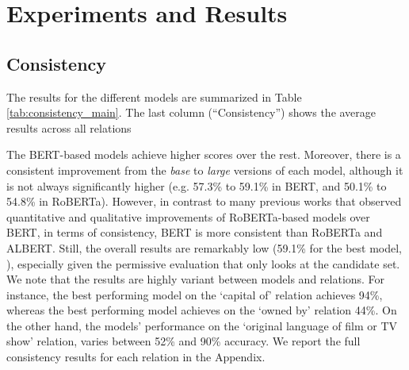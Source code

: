 \section{Experiments and Results}
\label{sec:experiments}




\subsection{Consistency}

The results for the different models are summarized in Table \ref{tab:consistency_main}.
The last column (``Consistency'') shows the average results across all relations 

The BERT-based models achieve higher scores over the rest. Moreover, there is a consistent improvement from the \textit{base} to \textit{large} versions of each model, although it is not always significantly  higher (e.g. 57.3\% to 59.1\% in BERT, and 50.1\% to 54.8\% in RoBERTa).
However, in contrast to many previous works that observed quantitative and qualitative improvements of RoBERTa-based models over BERT, in terms of consistency, BERT is more consistent than RoBERTa and ALBERT.
Still, the overall results are remarkably low (59.1\% for the best model, ), especially given the permissive evaluation that only looks at the candidate set.
We note that the results are highly variant between models and relations. For instance, the best performing model on the `capital of' relation achieves 94\%, whereas the best performing model achieves on the `owned by' relation 44\%. 
On the other hand, the models' performance on the `original language of film or TV show' relation, varies between 52\% and 90\% accuracy.
We report the full consistency results for each relation in the Appendix.





